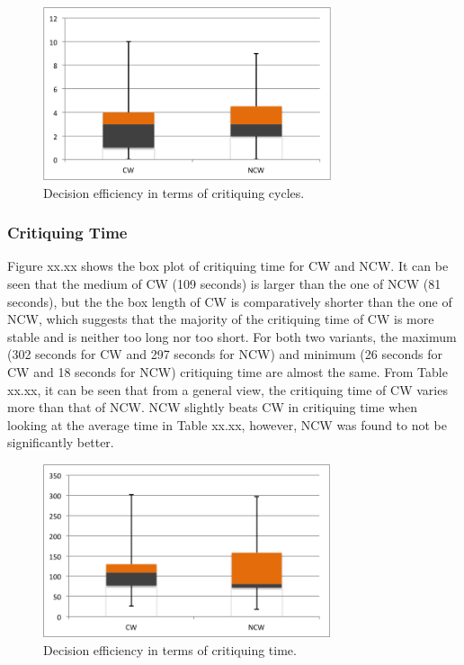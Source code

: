 \begin{figure}[H]
	\centering
	\includegraphics[height=2in]{figures/critiquingCycles.png}
	\caption{Decision efficiency in terms of critiquing cycles.}
	\label{fig:critiquingCycles}
\end{figure}

\subsubsection{Critiquing Time} \label{sec:results_de_ct}

Figure xx.xx shows the box plot of critiquing time for CW and NCW. It can be seen that the medium of CW (109 seconds) is larger than the one of NCW (81 seconds), but the the box length of CW is comparatively shorter than the one of NCW, which suggests that the majority of the critiquing time of CW is more stable and is neither too long nor too short. For both two variants, the maximum (302 seconds for CW and 297 seconds for NCW) and minimum  (26 seconds for CW and 18 seconds for NCW) critiquing time are almost the same. 
From Table xx.xx, it can be seen that from a general view, the critiquing time of CW varies more than that of NCW. NCW slightly beats CW in critiquing time when looking at the average time in Table xx.xx, however, NCW was found to not be significantly better.

\begin{figure}[H]
	\centering
	\includegraphics[height=2in]{figures/critiquingTime.png}
	\caption{Decision efficiency in terms of critiquing time.}
	\label{fig:critiquingTime}
\end{figure}

